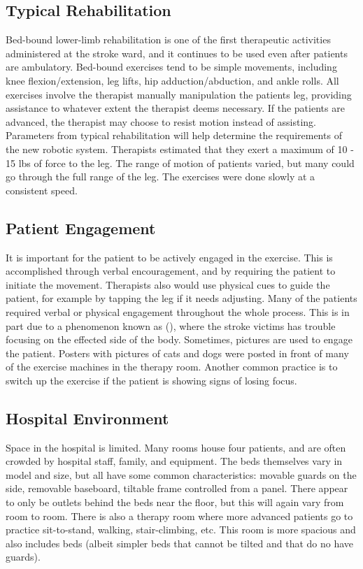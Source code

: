 \documentclass[12pt]{report}
\begin{document}
	\subsection{Typical Rehabilitation}
	
	Bed-bound lower-limb rehabilitation is one of the first therapeutic activities administered at the stroke ward, and it continues to be used even after patients are ambulatory. Bed-bound exercises tend to be simple movements, including knee flexion/extension, leg lifts, hip adduction/abduction, and ankle rolls. All exercises involve the therapist manually manipulation the patients leg, providing assistance to whatever extent the therapist deems necessary. If the patients are advanced, the therapist may choose to resist motion instead of assisting. 
	Parameters from typical rehabilitation will help determine the requirements of the new robotic system. Therapists estimated that they exert a maximum of 10 - 15 lbs of force to the leg. The range of motion of patients varied, but many could go through the full range of the leg. The exercises were done slowly at a consistent speed. 
	
	\subsection{Patient Engagement} 
	 It is important for the patient to be actively engaged in the exercise. This is accomplished through verbal encouragement, and by requiring the patient to initiate the movement. Therapists also would use physical cues to guide the patient, for example by tapping the leg if it needs adjusting. Many of the patients required verbal or physical engagement throughout the whole process. This is in part due to a phenomenon known as (), where the stroke victims has trouble focusing on the effected side of the body. Sometimes, pictures are used to engage the patient. Posters with pictures of cats and dogs were posted in front of many of the exercise machines in the therapy room. Another common practice is to switch up the exercise if the patient is showing signs of losing focus. 
	 
	 \subsection{Hospital Environment}
	Space in the hospital is limited. Many rooms house four patients, and are often crowded by hospital staff, family, and equipment. The beds themselves vary in model and size, but all have some common characteristics: movable guards on the side, removable baseboard, tiltable frame controlled from a panel. There appear to only be outlets behind the beds near the floor, but this will again vary from room to room. 
	There is also a therapy room where more advanced patients go to practice sit-to-stand, walking, stair-climbing, etc. This room is more spacious and also includes beds (albeit simpler beds that cannot be tilted and that do no have guards). 
	 
\end{document}
